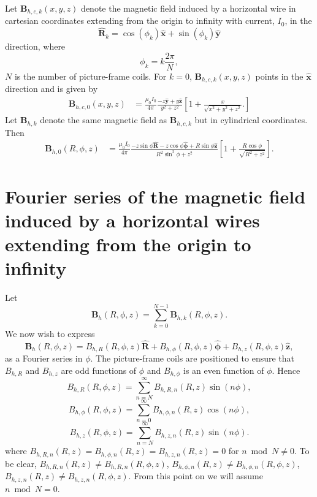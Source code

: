 \documentclass{article}
\let\vec\mathbf
\begin{document}
Let $\vec{B}_{h,c, k}(x,y,z)$ denote the magnetic field induced by a horizontal
wire in cartesian coordinates extending from the origin to infinity with current, $I_0$, in the
\[\vec{\hat{R}}_k=\cos(\phi_k)\vec{\hat{x}} + \sin(\phi_k)\vec{\vec{\hat{y}}}\]
direction, where
\[\phi_k = k\frac{2\pi}{N},\]
$N$ is the number of picture-frame coils. For $k=0$, $\vec{B}_{h,c,k}(x,y,z)$ points in the $\vec{\hat{x}}$ direction
and is given by
\[\begin{aligned}
    \vec{B}_{h,c,0}(x, y, z) &= \frac{\mu_0 I_0}{4\pi}\frac{-z\vec{\hat{y}} + y\vec{\hat{z}}}{y^2+z^2}\left[1+\frac{x}{\sqrt{x^2+y^2+z^2}}.\right]
\end{aligned}\]
Let $\vec{B}_{h,k}$ denote the same magnetic field as $\vec{B}_{h,c,k}$ but in cylindrical coordinates. Then
\[\begin{aligned}
    \vec{B}_{h,0}(R, \phi, z) &= \frac{\mu_0 I_0}{4\pi}\frac{-z\sin\phi\vec{\hat{R}} -z\cos\phi\vec{\hat{\phi}} + R\sin\phi\vec{\hat{z}}}{R^2\sin^2\phi+z^2}\left[1+\frac{R\cos\phi}{\sqrt{R^2+z^2}}\right].
\end{aligned}\]

\section{Fourier series of the magnetic field induced by a horizontal wires extending from the origin to infinity}

Let 
\[\vec{B}_{h}(R,\phi,z)=\sum_{k=0}^{N-1}\vec{B}_{h,k}(R, \phi, z).\]
We now wish to express
\[\vec{B}_{h}(R,\phi,z)=B_{h, R}(R, \phi, z)\vec{\hat{R}} + B_{h, \phi}(R, \phi, z)\vec{\hat{\phi}} + B_{h, z}(R, \phi, z)\vec{\hat{z}},\]
as a Fourier series in $\phi$. The picture-frame coils are positioned to ensure that $B_{h, R}$ and $B_{h, z}$ are odd
functions of $\phi$ and $B_{h, \phi}$ is an even function of $\phi$. Hence
\[B_{h,R}(R, \phi, z) = \sum_{n=N}^{\infty}B_{h, R, n}(R, z)\sin(n\phi),\]
\[B_{h,\phi}(R, \phi, z) = \sum_{n=0}^{\infty}B_{h, \phi, n}(R, z)\cos(n\phi),\]
\[B_{h, z}(R, \phi, z) = \sum_{n=N}^{\infty}B_{h, z, n}(R, z)\sin(n\phi).\]
where $B_{h, R, n}(R, z)=B_{h, \phi, n}(R, z)=B_{h, z, n}(R, z)=0$ for $n \bmod N \ne 0$.
To be clear, $B_{h, R, n}(R, z)\ne B_{h, R, n}(R, \phi, z)$, $B_{h, \phi, n}(R, z)\ne B_{h, \phi, n}(R, \phi, z)$,
$B_{h, z, n}(R, z)\ne B_{h, z, n}(R, \phi, z)$. From this point on we will assume $n \bmod N = 0$.
\end{document}

